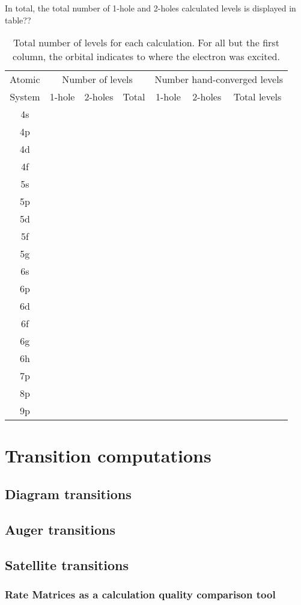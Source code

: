 In total, the total number of 1-hole and 2-holes calculated levels is displayed in table??

\begin{table}[h!]
    \centering
    \caption{Total number of levels for each calculation. For all but the first column, the orbital indicates to where the electron was excited.}
    \label{tab:tot_ang_mom}
    \begin{tabular}{c|c|c|c|c|c|c}
        \toprule Atomic&\multicolumn{3}{c|}{Number of levels}&\multicolumn{3}{c}{Number hand-converged levels}\\
        System&1-hole&2-holes&Total&1-hole&2-holes&Total levels\\
        \midrule 4s\\
        4p\\
        4d\\
        4f\\
        5s\\
        5p\\
        5d\\
        5f\\
        5g\\
        6s\\
        6p\\
        6d\\
        6f\\
        6g\\
        6h\\
        7p\\
        8p\\
        9p\\
        \bottomrule
    \end{tabular}
\end{table}



\section{Transition computations}
\subsection{Diagram transitions}
\subsection{Auger transitions}
\subsection{Satellite transitions}

\subsubsection{Rate Matrices as a calculation quality comparison tool}

